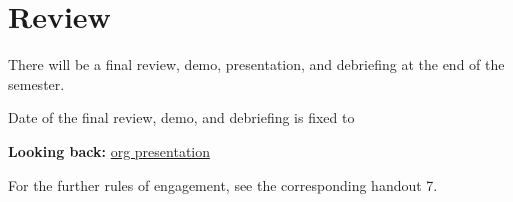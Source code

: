 
\section*{Review}
\label{sec:review}

There will be a final review, demo, presentation, and debriefing at the end
of the semester.


Date of the final review, demo, and debriefing is fixed to
\begin{center}
\end{center}



\begin{center}
  \textbf{Looking back:} \href{slides/main-review.pdf}{org presentation}
\end{center}

For the further rules of engagement, see the corresponding handout 7.














